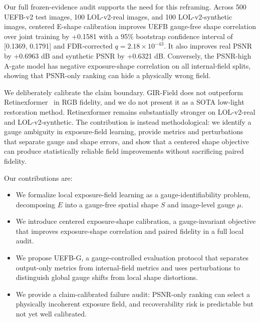Our full frozen-evidence audit supports the need for this reframing. Across 500 UEFB-v2 test images, 100 LOL-v2-real images, and 100 LOL-v2-synthetic images, centered E-shape calibration improves UEFB gauge-free shape correlation over joint training by +0.1581 with a 95\% bootstrap confidence interval of [0.1369, 0.1791] and FDR-corrected $q=2.18\times10^{-43}$. It also improves real PSNR by +0.6963 dB and synthetic PSNR by +0.6321 dB. Conversely, the PSNR-high A-gate model has negative exposure-shape correlation on all internal-field splits, showing that PSNR-only ranking can hide a physically wrong field.

We deliberately calibrate the claim boundary. GIR-Field does not outperform Retinexformer~\cite{cai2023retinexformer} in RGB fidelity, and we do not present it as a SOTA low-light restoration method. Retinexformer remains substantially stronger on LOL-v2-real and LOL-v2-synthetic. The contribution is instead methodological: we identify a gauge ambiguity in exposure-field learning, provide metrics and perturbations that separate gauge and shape errors, and show that a centered shape objective can produce statistically reliable field improvements without sacrificing paired fidelity.

Our contributions are:
\begin{itemize}
    \item We formalize local exposure-field learning as a gauge-identifiability problem, decomposing $E$ into a gauge-free spatial shape $S$ and image-level gauge $\mu$.
    \item We introduce centered exposure-shape calibration, a gauge-invariant objective that improves exposure-shape correlation and paired fidelity in a full local audit.
    \item We propose UEFB-G, a gauge-controlled evaluation protocol that separates output-only metrics from internal-field metrics and uses perturbations to distinguish global gauge shifts from local shape distortions.
    \item We provide a claim-calibrated failure audit: PSNR-only ranking can select a physically incoherent exposure field, and recoverability risk is predictable but not yet well calibrated.
\end{itemize}
